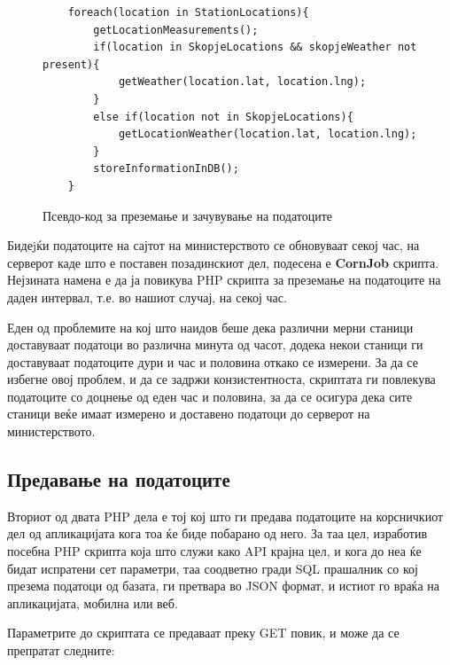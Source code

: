\documentclass{uvamscse}
\begin{document}
\begin{figure}[H]
\centering
\begin{snippet}
\begin{verbatim}
    foreach(location in StationLocations){
        getLocationMeasurements();
        if(location in SkopjeLocations && skopjeWeather not present){
            getWeather(location.lat, location.lng);
        }
        else if(location not in SkopjeLocations){
            getLocationWeather(location.lat, location.lng);
        }
        storeInformationInDB();
    }
\end{verbatim}
\end{snippet}
\caption{Псевдо-код за преземање и зачувување на податоците}
\label{fig:preudocode}
\end{figure}

Бидеjќи податоците на сајтот на министерството се обновуваат секој час, на серверот каде што е поставен позадинскиот дел, подесена е \textbf{CornJob} скрипта. Нејзината намена е да ја повикува PHP скрипта за преземање на податоците на даден интервал, т.е. во нашиот случај, на секој час.
\vspace{5mm}

Еден од проблемите на кој што наидов беше дека различни мерни станици доставуваат податоци во различна минута од часот, додека некои станици ги доставуваат податоците дури и час и половина откако се измерени. За да се избегне овој проблем, и да се задржи конзистентноста, скриптата ги повлекува податоците со доцнење од еден час и половина, за да се осигура дека сите станици веќе имаат измерено и доставено податоци до серверот на министерството.

\subsection{Предавање на податоците}

Вториот од двата PHP дела е тој кој што ги предава податоците на корсничкиот дел од апликацијата кога тоа ќе биде побарано од него. За таа цел, изработив посебна PHP скрипта која што служи како API крајна цел, и кога до неа ќе бидат испратени сет параметри, таа соодветно гради SQL прашалник со кој презема податоци од базата, ги претвара во JSON формат, и истиот го враќа на апликацијата, мобилна или веб.
\vspace{5mm}

Параметрите до скриптата се предаваат преку GET повик, и може да се препратат следните:
\end{document}
